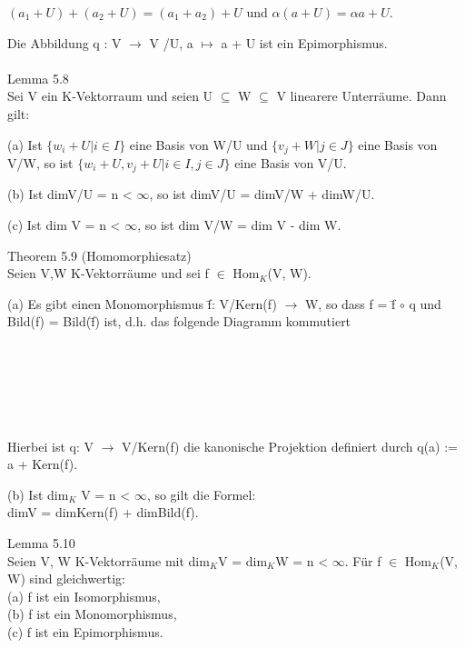\documentclass[fontsize=10pt]{scrartcl}
\begin{document}
\begin{center}
$(a_1 + U)+(a_2 + U)=(a_1 +a_2)+U$ und $\alpha(a+U)=\alpha a+U$.
\end{center} 
Die Abbildung q : V $\to$ V /U, a $\mapsto$ a + U ist ein Epimorphismus.\\
\\
Lemma 5.8\\
Sei V ein K-Vektorraum und seien U $\subseteq$ W $\subseteq$ V linearere Unterräume. Dann gilt:
\begin{compactenum}
\item[(a)] Ist $\{w_i + U | i \in I\}$ eine Basis von W/U und $\{v_j + W | j \in J\}$ eine Basis von V/W, so ist $\{w_i +U, v_j +U | i \in I, j \in J\}$ eine Basis von V/U.
\item[(b)] Ist dimV/U = n < $\infty$, so ist dimV/U = dimV/W + dimW/U.
\item[(c)] Ist dim V = n < $\infty$, so ist dim V/W = dim V - dim W.\\
\end{compactenum}
Theorem 5.9 (Homomorphiesatz)\\
Seien V,W K-Vektorräume und sei f $\in$ Hom$_K$(V, W).
\begin{compactenum}
\item[(a)] Es gibt einen Monomorphismus \={f}: V/Kern(f) $\to$ W, so dass f = \={f} $\circ$ q und Bild(f) = Bild(\={f}) ist, d.h. das folgende Diagramm kommutiert\\
\\
\\
\\
\\
\\
\\
Hierbei ist q: V $\to$ V/Kern(f) die kanonische Projektion definiert durch q(a) := a + Kern(f).
\item[(b)] Ist dim$_K$ V = n < $\infty$, so gilt die Formel: \\
dimV = dimKern(f) + dimBild(f).\\
\end{compactenum}
Lemma 5.10\\
Seien V, W K-Vektorräume mit dim$_K$V = dim$_K$W = n < $\infty$. Für f $\in$ Hom$_K$(V, W) sind gleichwertig: \\
(a) f ist ein Isomorphismus, \\
(b) f ist ein Monomorphismus,\\ 
(c) f ist ein Epimorphismus. \\
\end{document}
